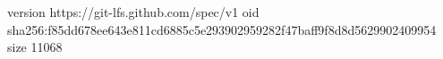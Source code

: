 version https://git-lfs.github.com/spec/v1
oid sha256:f85dd678ee643e811cd6885c5e293902959282f47baff9f8d8d5629902409954
size 11068
